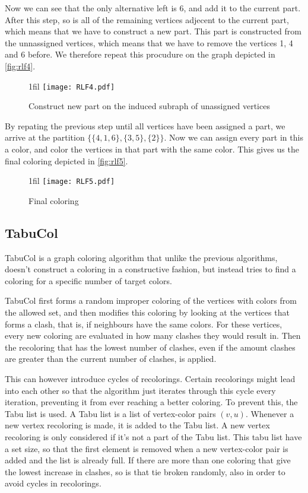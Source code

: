 \documentclass[a4paper]{article}
\makeatletter
\newcommand*{\centerfloat}{%
  \parindent \z@
  \leftskip \z@ \@plus 1fil \@minus \textwidth
  \rightskip\leftskip
  \parfillskip \z@skip}
\makeatother
\begin{document}
Now we can see that the only alternative left is 6, and add it to the current
part. After this step, so is all of the remaining vertices adjecent to the
current part, which means that we have to construct a new part. This part is
constructed from the unnassigned vertices, which means that we have to remove
the vertices  1, 4 and 6 before. We therefore repeat this procudure on the graph 
depicted in \autoref{fig:rlf4}.

\begin{figure}[H]
    \centerfloat
    \texttt{[image: RLF4.pdf]}
    \caption{Construct new part on the induced subraph of unassigned vertices}
    \label{fig:rlf4}
\end{figure}

By repating the previous step until all vertices have been assigned a part, we 
arrive at the partition $\{\{4,1,6\},\{3,5\},\{2\}\}$. Now we can assign every
part in this a color, and color the vertices in that part with the same color. 
This gives us the final coloring depicted in \autoref{fig:rlf5}.

\begin{figure}[H]
    \centerfloat
    \texttt{[image: RLF5.pdf]}
    \caption{Final coloring}
    \label{fig:rlf5}
\end{figure}



\subsection{TabuCol}

TabuCol is a graph coloring algorithm that unlike the previous algorithms, doesn't
construct a coloring in a constructive fashion, but instead tries to find a
coloring for a specific number of target colors.

TabuCol first forms a random improper coloring of the vertices with colors from
the allowed set, and then modifies this coloring by looking at the vertices that
forms a clash, that is, if neighbours have the same colors. For these vertices,
every new coloring are evaluated in how many clashes they would result in. 
Then the recoloring that has the lowest number of clashes, even if the amount
clashes are greater than the current number of clashes, is applied.

This can however introduce cycles of recolorings. Certain recolorings might
lead into each other so that the algorithm just iterates through this cycle
every iteration, preventing it from ever reaching a better coloring. To prevent
this, the Tabu list is used. A Tabu list is a list of vertex-color pairs
$(v,u)$. Whenever a new vertex recoloring is made, it is added to the Tabu
list. A new vertex recoloring is only considered if it's not a part of the Tabu
list. This tabu list have a set size, so that the first element is removed when
a new vertex-color pair is added and the list is already full. If there are more than one coloring that give
the lowest increase in clashes, so is that tie broken randomly, also in order
to avoid cycles in recolorings.
\end{document}

